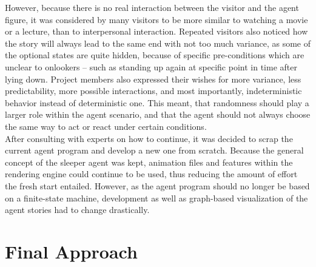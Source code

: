 \documentclass[draft,final]{vutinfth} %
\begin{document}
However, because there is no real interaction between the visitor and the agent figure, it was considered by many visitors to be more similar to watching a movie or a lecture, than to interpersonal interaction. 
Repeated visitors also noticed how the story will always lead to the same end with not too much variance, as some of the optional states are quite hidden, because of specific pre-conditions which are unclear to onlookers – such as standing up again at specific point in time after lying down. 
Project members also expressed their wishes for more variance, less predictability, more possible interactions, and most importantly, indeterministic behavior instead of deterministic one.
This meant, that randomness should play a larger role within the agent scenario, and that the agent should not always choose the same way to act or react under certain conditions. \\
After consulting with experts on how to continue, it was decided to scrap the current agent program and develop a new one from scratch. 
Because the general concept of the sleeper agent was kept, animation files and features within the rendering engine could continue to be used, thus reducing the amount of effort the fresh start entailed. 
However, as the agent program should no longer be based on a finite-state machine, development as well as graph-based visualization of the agent stories had to change drastically.

\section{Final Approach}
\label{chap:finalapproach}
\end{document}
